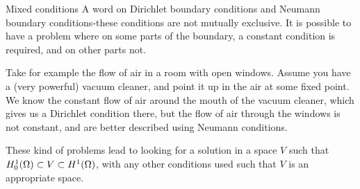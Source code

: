 \begin{exmp}{Mixed conditions}
A word on Dirichlet boundary conditions and Neumann boundary 
conditions-these conditions are not mutually exclusive.
It is possible to have a problem where on some parts of the boundary, 
a constant condition is required, and on other parts not.

Take for example the flow of air in a room with open windows. 
Assume you have a (very powerful) vacuum cleaner,
 and point it up in the air at some fixed point. 
We know the constant flow of air around the mouth of the vacuum cleaner, which 
gives us a Dirichlet condition there, but the flow of air through the 
windows is not constant, and are better described using Neumann conditions.

These kind of problems lead to looking for a solution in a space $V$ such that 
$H^1_0(\Omega) \subset V \subset H^1(\Omega)$, with any other conditions used such 
that $V$ is an appropriate space.
\end{exmp}